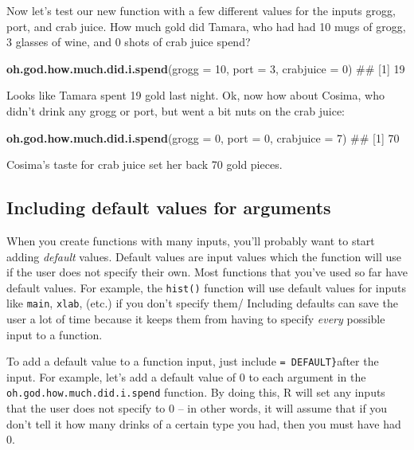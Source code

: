 \documentclass[]{book}
\newenvironment{Shaded}{\begin{snugshade}}{\end{snugshade}}
\newcommand{\KeywordTok}[1]{\textcolor[rgb]{0.13,0.29,0.53}{\textbf{#1}}}
\newcommand{\DataTypeTok}[1]{\textcolor[rgb]{0.13,0.29,0.53}{#1}}
\newcommand{\DecValTok}[1]{\textcolor[rgb]{0.00,0.00,0.81}{#1}}
\newcommand{\NormalTok}[1]{#1}
\theoremstyle{definition}
\theoremstyle{definition}
\theoremstyle{remark}
\begin{document}
Now let's test our new function with a few different values for the
inputs grogg, port, and crab juice. How much gold did Tamara, who had
had 10 mugs of grogg, 3 glasses of wine, and 0 shots of crab juice
spend?

\begin{Shaded}
\begin{Highlighting}[]
\KeywordTok{oh.god.how.much.did.i.spend}\NormalTok{(}\DataTypeTok{grogg =} \DecValTok{10}\NormalTok{,}
                            \DataTypeTok{port =} \DecValTok{3}\NormalTok{,}
                            \DataTypeTok{crabjuice =} \DecValTok{0}\NormalTok{)}
\NormalTok{## [1] 19}
\end{Highlighting}
\end{Shaded}

Looks like Tamara spent 19 gold last night. Ok, now how about Cosima,
who didn't drink any grogg or port, but went a bit nuts on the crab
juice:

\begin{Shaded}
\begin{Highlighting}[]
\KeywordTok{oh.god.how.much.did.i.spend}\NormalTok{(}\DataTypeTok{grogg =} \DecValTok{0}\NormalTok{,}
                            \DataTypeTok{port =} \DecValTok{0}\NormalTok{,}
                            \DataTypeTok{crabjuice =} \DecValTok{7}\NormalTok{)}
\NormalTok{## [1] 70}
\end{Highlighting}
\end{Shaded}

Cosima's taste for crab juice set her back 70 gold pieces.

\subsection{Including default values for
arguments}\label{including-default-values-for-arguments}

When you create functions with many inputs, you'll probably want to
start adding \emph{default} values. Default values are input values
which the function will use if the user does not specify their own. Most
functions that you've used so far have default values. For example, the
\texttt{hist()} function will use default values for inputs like
\texttt{main}, \texttt{xlab}, (etc.) if you don't specify them/
Including defaults can save the user a lot of time because it keeps them
from having to specify \emph{every} possible input to a function.

To add a default value to a function input, just include
\texttt{=\ DEFAULT\}}after the input. For example, let's add a default
value of 0 to each argument in the \texttt{oh.god.how.much.did.i.spend}
function. By doing this, R will set any inputs that the user does not
specify to 0 -- in other words, it will assume that if you don't tell it
how many drinks of a certain type you had, then you must have had 0.
\end{document}
